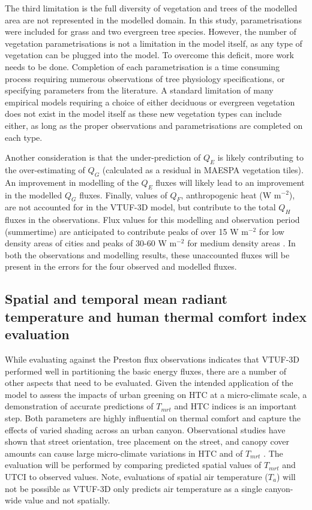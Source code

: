 \documentclass[final,3p,times,authoryear]{elsarticle}
\begin{document}
The third limitation is the full diversity of vegetation and trees of the modelled area are not represented in the modelled domain. In this study, parametrisations were included for grass and two evergreen tree species. However, the number of vegetation parametrisations is not a limitation in the model itself, as any type of vegetation can be plugged into the model. To overcome this deficit, more work needs to be done. Completion of each parametrisation is a time consuming process requiring numerous observations of tree physiology specifications, or specifying parameters from the literature. A standard limitation of many empirical models requiring a choice of either deciduous or evergreen vegetation does not exist in the model itself as these new vegetation types can include either, as long as the proper observations and parametrisations are completed on each type.


Another consideration is that the under-prediction of $Q_{E}$ is likely contributing to the over-estimating of $Q_{G}$ (calculated as a residual in MAESPA vegetation tiles). An improvement in modelling of the $Q_{E}$ fluxes will likely lead to an improvement in the modelled $Q_{G}$ fluxes. Finally, values of $Q_{F}$, anthropogenic heat (W m$^{-2}$), are not accounted for in the VTUF-3D model, but contribute to the total $Q_{H}$ fluxes in the observations. Flux values for this modelling and observation period (summertime) are anticipated to contribute peaks of over 15 W m$^{-2}$ for low density areas of cities and peaks of 30-60 W m$^{-2}$ for medium density areas \citep{Sailor2004}. In both the observations and modelling results, these unaccounted fluxes will be present in the errors for the four observed and modelled fluxes. 



\subsection{Spatial and temporal mean radiant temperature and human thermal comfort index evaluation}\label{sec:CoMValidations}

While evaluating against the Preston flux observations indicates that VTUF-3D performed well in partitioning the basic energy fluxes, there are a number of other aspects that need to be evaluated. Given the intended application of the model to assess the impacts of urban greening on HTC at a micro-climate scale, a demonstration of accurate predictions of $T_{mrt}$ and HTC indices is an important step. Both parameters are highly influential on thermal comfort and capture the effects of varied shading across an urban canyon. Observational studies have shown that street orientation, tree placement on the street, and canopy cover amounts can cause large micro-climate variations in HTC and of $T_{mrt}$ \citep{Sanusi2016,Oliveira2011,Ali-Toudert2007}. The evaluation will be performed by comparing predicted spatial values of $T_{mrt}$ and UTCI to observed values. Note, evaluations of spatial air temperature ($T_{a}$) will not be possible as VTUF-3D only predicts air temperature as a single canyon-wide value and not spatially.
\end{document}
